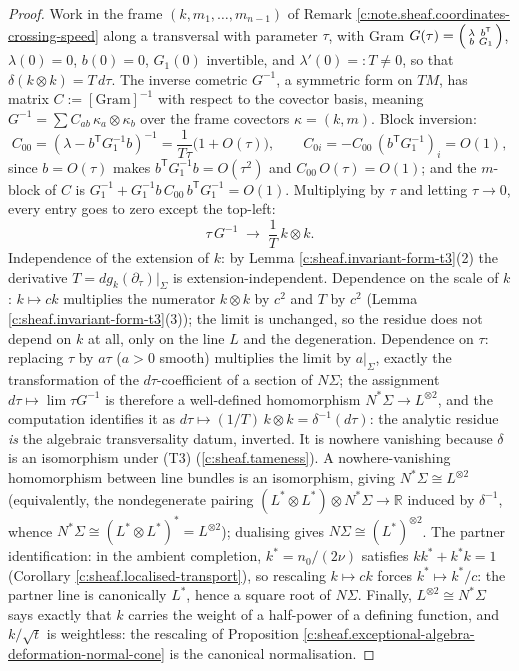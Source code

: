 \documentclass[11pt]{article}
\theoremstyle{definition}
\theoremstyle{plain}
\providecommand{\R}{}\renewcommand{\R}{\mathbb{R}}
\providecommand{\Sig}{}\renewcommand{\Sig}{\Sigma}
\providecommand{\nO}{}\renewcommand{\nO}{n_0}
\providecommand{\shL}{}\renewcommand{\shL}{L}
\begin{document}
\begin{proof}
Work in the frame $(k, m_1, \dots, m_{n-1})$ of Remark \ref{c:note.sheaf.coordinates-crossing-speed} along a transversal with parameter $\tau$, with Gram $G(\tau) = \begin{psmallmatrix} \lambda & b^{\mathsf T} \\ b & G_1 \end{psmallmatrix}$, $\lambda(0) = 0$, $b(0) = 0$, $G_1(0)$ invertible, and $\lambda'(0) =: T \neq 0$, so that $\delta(k \otimes k) = T\, d\tau$. The inverse cometric $G^{-1}$, a symmetric form on $TM$, has matrix $C := [\text{Gram}]^{-1}$ with respect to the covector basis, meaning $G^{-1} = \sum C_{ab}\, \kappa_a \otimes \kappa_b$ over the frame covectors $\kappa = (k, m)$. Block inversion:
\[
C_{00} = (\lambda - b^{\mathsf T} G_1^{-1} b)^{-1} = \frac{1}{T\tau}\bigl(1 + O(\tau)\bigr), \qquad
C_{0i} = -C_{00}\, (b^{\mathsf T} G_1^{-1})_i = O(1),
\]
since $b = O(\tau)$ makes $b^{\mathsf T} G_1^{-1} b = O(\tau^2)$ and $C_{00}\,O(\tau) = O(1)$; and the $m$-block of $C$ is $G_1^{-1} + G_1^{-1} b\, C_{00}\, b^{\mathsf T} G_1^{-1} = O(1)$. Multiplying by $\tau$ and letting $\tau \to 0$, every entry goes to zero except the top-left:
\[
\tau\, G^{-1} \;\longrightarrow\; \frac{1}{T}\, k \otimes k .
\]
Independence of the extension of $k$: by Lemma \ref{c:sheaf.invariant-form-t3}(2) the derivative $T = dg_k(\partial_\tau)|_\Sig$ is extension-independent. Dependence on the scale of $k$: $k \mapsto ck$ multiplies the numerator $k \otimes k$ by $c^2$ and $T$ by $c^2$ (Lemma \ref{c:sheaf.invariant-form-t3}(3)); the limit is unchanged, so the residue does not depend on $k$ at all, only on the line $\shL$ and the degeneration. Dependence on $\tau$: replacing $\tau$ by $a\tau$ ($a > 0$ smooth) multiplies the limit by $a|_\Sig$, exactly the transformation of the $d\tau$-coefficient of a section of $N\Sig$; the assignment $d\tau \mapsto \lim \tau G^{-1}$ is therefore a well-defined homomorphism $N^*\Sig \to \shL^{\otimes 2}$, and the computation identifies it as $d\tau \mapsto (1/T)\,k \otimes k = \delta^{-1}(d\tau)$: the analytic residue \emph{is} the algebraic transversality datum, inverted. It is nowhere vanishing because $\delta$ is an isomorphism under (T3) (\ref{c:sheaf.tameness}). A nowhere-vanishing homomorphism between line bundles is an isomorphism, giving $N^*\Sig \cong \shL^{\otimes 2}$ (equivalently, the nondegenerate pairing $(\shL^* \otimes \shL^*) \otimes N^*\Sig \to \R$ induced by $\delta^{-1}$, whence $N^*\Sig \cong (\shL^* \otimes \shL^*)^* = \shL^{\otimes 2}$); dualising gives $N\Sig \cong (\shL^*)^{\otimes 2}$. The partner identification: in the ambient completion, $k^* = \nO/(2\nu)$ satisfies $kk^* + k^*k = 1$ (Corollary \ref{c:sheaf.localised-transport}), so rescaling $k \mapsto ck$ forces $k^* \mapsto k^*/c$: the partner line is canonically $\shL^*$, hence a square root of $N\Sig$. Finally, $\shL^{\otimes 2} \cong N^*\Sig$ says exactly that $k$ carries the weight of a half-power of a defining function, and $k/\sqrt t$ is weightless: the rescaling of Proposition \ref{c:sheaf.exceptional-algebra-deformation-normal-cone} is the canonical normalisation.

\end{proof}
\end{document}

